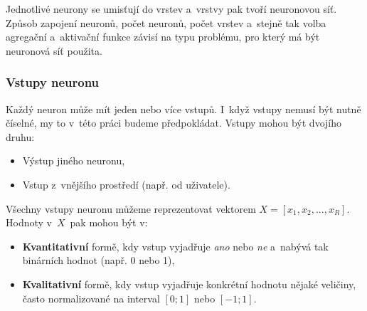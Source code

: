\documentclass[a4paper,12pt]{article}
\begin{document}
{{{{

Jednotlivé neurony se umisťují do vrstev a~vrstvy pak tvoří neuronovou síť. Způsob zapojení neuronů, počet neuronů, počet vrstev a~stejně tak volba agregační a~aktivační funkce závisí na typu problému, pro který má být neuronová síť použita.


\subsubsection{Vstupy neuronu}

Každý neuron může mít jeden nebo více vstupů. I~když vstupy nemusí být nutně číselné, my to v~této práci budeme předpokládat. Vstupy mohou být dvojího druhu:

\begin{itemize}
\item Výstup jiného neuronu,
\item Vstup z~vnějšího prostředí (např. od uživatele).
\end{itemize}

Všechny vstupy neuronu můžeme reprezentovat vektorem $X = [{x_1, x_2, ..., x_R}]$. Hodnoty v~$X$~pak mohou být v:

\begin{itemize}
\item \textbf{Kvantitativní} formě, kdy vstup vyjadřuje \textit{ano} nebo \textit{ne} a~nabývá tak binárních hodnot (např. 0 nebo 1),
\item \textbf{Kvalitativní} formě, kdy vstup vyjadřuje konkrétní hodnotu nějaké veličiny, často normalizované na interval $[0; 1]$ nebo $[-1; 1]$.
\end{itemize}

}}}}
\end{document}
